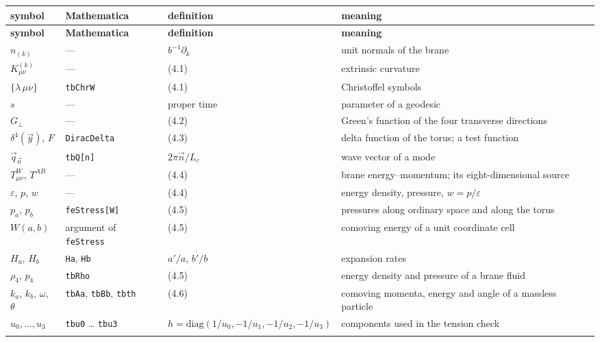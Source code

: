 \documentclass[10pt,a4paper]{article}
\begin{document}
{\footnotesize
\begin{longtable}{>{\raggedright\arraybackslash}p{}>{\raggedright\arraybackslash}p{}>{\raggedright\arraybackslash}p{}>{\raggedright\arraybackslash}p{}}
\toprule
\textbf{symbol} & \textbf{Mathematica} & \textbf{definition} & \textbf{meaning} \\
\midrule\endfirsthead
\toprule
\textbf{symbol} & \textbf{Mathematica} & \textbf{definition} & \textbf{meaning} \\
\midrule\endhead
\endfoot
\bottomrule\endlastfoot
$n_{(k)}$ & — & $b^{-1}\partial_k$ & unit normals of the brane \\
$K^{(k)}_{\mu\nu}$ & — & (4.1) & extrinsic curvature \\
$\{\lambda\,\mu\nu\}$ & \texttt{tbChrW} & (4.1) & Christoffel symbols \\
$s$ & — & proper time & parameter of a geodesic \\
$G_\perp$ & — & (4.2) & Green’s function of the four transverse directions \\
$\delta^4(\vec y)$, $F$ & \texttt{DiracDelta} & (4.3) & delta function of the torus; a test function \\
$\vec q_{\vec n}$ & \texttt{tbQ[n]} & $2\pi\vec n/L_c$ & wave vector of a mode \\
$T^W_{\mu\nu}$, $T^{AB}$ & — & (4.4) & brane energy–momentum; its eight-dimensional source \\
$\varepsilon$, $p$, $w$ & — & (4.4) & energy density, pressure, $w=p/\varepsilon$ \\
$p_a$, $p_b$ & \texttt{feStress[W]} & (4.5) & pressures along ordinary space and along the torus \\
$W(a,b)$ & argument of \texttt{feStress} & (4.5) & comoving energy of a unit coordinate cell \\
$H_a$, $H_b$ & \texttt{Ha}, \texttt{Hb} & $a'/a$, $b'/b$ & expansion rates \\
$\rho_4$, $p_4$ & \texttt{tbRho} & (4.5) & energy density and pressure of a brane fluid \\
$k_a$, $k_b$, $\omega$, $\theta$ & \texttt{tbAa}, \texttt{tbBb}, \texttt{tbth} & (4.6) & comoving momenta, energy and angle of a massless particle \\
$u_0,\dots,u_3$ & \texttt{tbu0} … \texttt{tbu3} & $h=\mathrm{diag}(1/u_0,-1/u_1,-1/u_2,-1/u_3)$ & components used in the tension check \\*
\end{longtable}}
\end{document}
